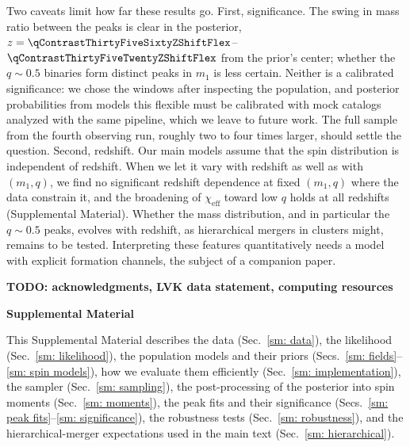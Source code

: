 \documentclass[%
 reprint,
 amsmath,amssymb,
 aps,
 prl,
 nofootinbib,nobibnotes,
 floatfix,
]{revtex4-2}
\newcommand{\chieff}{\ensuremath{\chi_{\mathrm{eff}}}}
\newcommand{\todo}[1]{{\color{Blue}\bf TODO: #1}}
\begin{document}
Two caveats limit how far these results go. First, significance. The swing in mass ratio between the peaks is clear in the posterior, $z = \qContrastThirtyFiveSixtyZShiftFlex$--$\qContrastThirtyFiveTwentyZShiftFlex$ from the prior's center; whether the $q \sim 0.5$ binaries form distinct peaks in $m_1$ is less certain. Neither is a calibrated significance: we chose the windows after inspecting the population, and posterior probabilities from models this flexible must be calibrated with mock catalogs analyzed with the same pipeline, which we leave to future work. The full sample from the fourth observing run, roughly two to four times larger, should settle the question. Second, redshift. Our main models assume that the spin distribution is independent of redshift. When we let it vary with redshift as well as with $(m_1, q)$, we find no significant redshift dependence at fixed $(m_1, q)$ where the data constrain it, and the broadening of $\chieff$ toward low $q$ holds at all redshifts (Supplemental Material). Whether the mass distribution, and in particular the $q \sim 0.5$ peaks, evolves with redshift, as hierarchical mergers in clusters might, remains to be tested. Interpreting these features quantitatively needs a model with explicit formation channels, the subject of a companion paper.

\begin{acknowledgments}
\todo{acknowledgments, LVK data statement, computing resources}
\end{acknowledgments}



\clearpage
\onecolumngrid
\setcounter{equation}{0}
\setcounter{figure}{0}
\setcounter{table}{0}
\setcounter{section}{0}
\renewcommand{\theequation}{S\arabic{equation}}
\renewcommand{\thefigure}{S\arabic{figure}}
\renewcommand{\thetable}{S\arabic{table}}
\renewcommand{\thesection}{S\arabic{section}}

\begin{center}
\textbf{\large Supplemental Material}
\end{center}

This Supplemental Material describes the data (Sec.~\ref{sm: data}), the likelihood (Sec.~\ref{sm: likelihood}), the population models and their priors (Secs.~\ref{sm: fields}--\ref{sm: spin models}), how we evaluate them efficiently (Sec.~\ref{sm: implementation}), the sampler (Sec.~\ref{sm: sampling}), the post-processing of the posterior into spin moments (Sec.~\ref{sm: moments}), the peak fits and their significance (Secs.~\ref{sm: peak fits}--\ref{sm: significance}), the robustness tests (Sec.~\ref{sm: robustness}), and the hierarchical-merger expectations used in the main text (Sec.~\ref{sm: hierarchical}).
\end{document}

